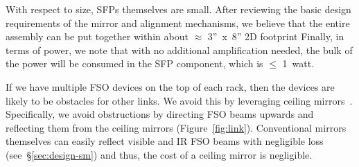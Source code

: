   With respect to  size, SFPs themselves are small.  After reviewing the basic
design requirements of the mirror and alignment mechanisms, we believe that the
entire assembly can be put together within about $\approx$ \mbox{3'' x 8''} 2D
footprint  Finally, in terms of power, we
note that with no additional amplification needed, the bulk of the power will
be consumed in  the SFP component, which is $\leq$ 1~watt. 
  


 If we have multiple FSO devices
on the top of each rack, then the devices are likely to be obstacles for other 
 links. We avoid this by   leveraging 
ceiling mirrors~\cite{3db}. 
Specifically, we avoid obstructions by  directing FSO beams  upwards and
reflecting them  from the ceiling mirrors  (Figure~\ref{fig:link}).
Conventional mirrors themselves can easily reflect visible and IR FSO beams with negligible
loss (see~\S\ref{sec:design-sm}) and thus, the cost of a ceiling mirror is negligible.
 








